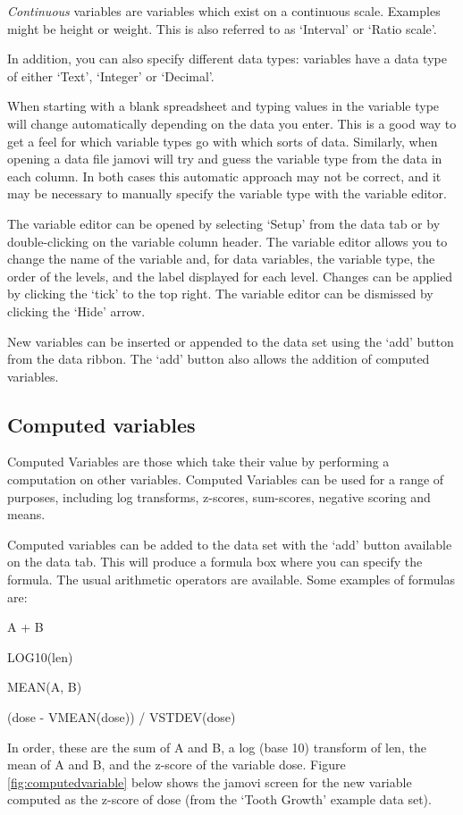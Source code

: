 {\it Continuous} variables are variables which exist on a continuous scale. Examples might be height or weight. This is also referred to as ‘Interval’ or ‘Ratio scale’.

In addition, you can also specify different data types: variables have a data type of either ‘Text’, ‘Integer’ or ‘Decimal’. 

When starting with a blank spreadsheet and typing values in the variable type will change automatically depending on the data you enter. This is a good way to get a feel for which variable types go with which sorts of data. Similarly, when opening a data file jamovi will try and guess the variable type from the data in each column. In both cases this automatic approach may not be correct, and it may be necessary to manually specify the variable type with the variable editor.

The variable editor can be opened by selecting ‘Setup’ from the data tab or by double-clicking on the variable column header. The variable editor allows you to change the name of the variable and, for data variables, the variable type, the order of the levels, and the label displayed for each level. Changes can be applied by clicking the ‘tick’ to the top right. The variable editor can be dismissed by clicking the `Hide' arrow.

New variables can be inserted or appended to the data set using the ‘add’ button from the data ribbon. The ‘add’ button also allows the addition of computed variables.

\subsection{Computed variables}

Computed Variables are those which take their value by performing a computation on other variables. Computed Variables can be used for a range of purposes, including log transforms, z-scores, sum-scores, negative scoring and means.

Computed variables can be added to the data set with the ‘add’ button available on the data tab. This will produce a formula box where you can specify the formula. The usual arithmetic operators are available. Some examples of formulas are:

A + B

LOG10(len)

MEAN(A, B)

(dose - VMEAN(dose)) / VSTDEV(dose)

In order, these are the sum of A and B, a log (base 10) transform of len, the mean of A and B, and the z-score of the variable dose. Figure \ref{fig:computedvariable} below shows the jamovi screen for the new variable computed as the z-score of dose (from the `Tooth Growth' example data set).

